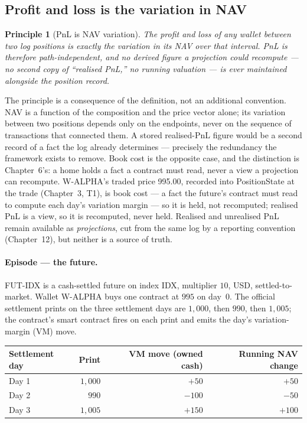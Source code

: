 \documentclass[11pt,a4paper]{article}
\newtheorem{principle}[definition]{Principle}
\begin{document}
\subsection{Profit and loss is the variation in NAV}\label{sec:pnl}

\begin{principle}[PnL is NAV variation]
The profit and loss of any wallet between two log positions is exactly the
variation in its NAV over that interval. PnL is therefore path-independent,
and no derived figure a projection could recompute --- no second copy of
``realised PnL,'' no running valuation --- is ever maintained alongside the
position record.
\end{principle}

The principle is a consequence of the definition, not an additional
convention. NAV is a function of the composition and the price vector alone;
its variation between two positions depends only on the endpoints, never on
the sequence of transactions that connected them. A stored realised-PnL figure
would be a second record of a fact the log already determines --- precisely
the redundancy the framework exists to remove. Book cost is the opposite
case, and the distinction is Chapter~6's: a home holds a fact a contract must
read, never a view a projection can recompute. W-ALPHA's traded price 995.00,
recorded into PositionState at the trade (Chapter~3, T1), is book cost --- a
fact the future's contract must read to compute each day's variation margin
--- so it is held, not recomputed; realised PnL is a view, so it is
recomputed, never held. Realised and unrealised PnL
remain available as \emph{projections}, cut from the same log by a reporting
convention (Chapter~12), but neither is a source of truth.

\paragraph{Episode --- the future.}
FUT-IDX is a cash-settled future on index IDX, multiplier $10$, USD,
settled-to-market. Wallet W-ALPHA buys one contract at $995$ on day~0. The
official settlement prints on the three settlement days are $1{,}000$, then
$990$, then $1{,}005$; the contract's smart contract fires on each print and
emits the day's variation-margin (VM) move.

\begin{center}
\begin{tabular}{lrrr}
\toprule
Settlement day & Print & VM move (owned cash) & Running NAV change \\
\midrule
Day 1 & $1{,}000$ & $+50$ & $+50$ \\
Day 2 & $\phantom{0}990$ & $-100$ & $-50$ \\
Day 3 & $1{,}005$ & $+150$ & $+100$ \\
\bottomrule
\end{tabular}
\end{center}
\end{document}
